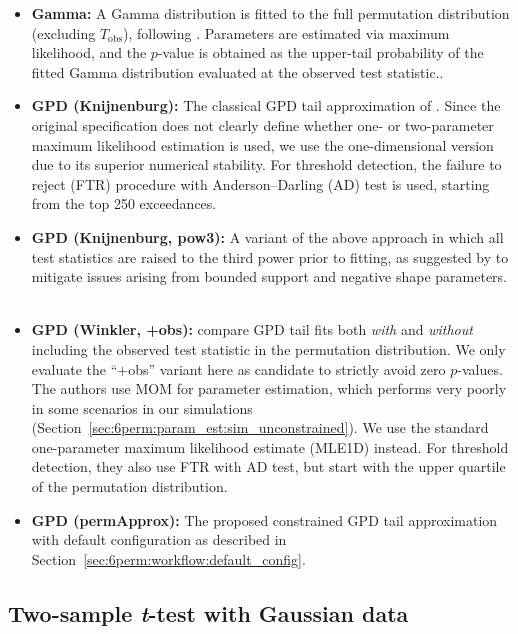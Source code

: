 \begin{itemize}
    \item \textbf{Gamma:} 
    A Gamma distribution is fitted to the full permutation distribution (excluding $T_{\mathrm{obs}}$), following \citet{winkler2016faster}. Parameters are estimated via maximum likelihood, and the $p$-value is obtained as the upper-tail probability of the fitted Gamma distribution evaluated at the observed test statistic..

    \item \textbf{GPD (Knijnenburg):} 
    The classical GPD tail approximation of \citet{knijnenburg2009fewer}. Since the original specification does not clearly define whether one- or two-parameter maximum likelihood estimation is used, we use the one-dimensional version due to its superior numerical stability. For threshold detection, the failure to reject (FTR) procedure with Anderson–Darling (AD) test is used, starting from the top 250 exceedances.
    
    \item \textbf{GPD (Knijnenburg, pow3):} 
    A variant of the above approach in which all test statistics are raised to the third power prior to fitting, as suggested by \citet{knijnenburg2009fewer} to mitigate issues arising from bounded support and negative shape parameters.\\~\\

    \item \textbf{GPD (Winkler, +obs):}
    \citet{winkler2016faster} compare GPD tail fits both \emph{with} and \emph{without} including the observed test statistic in the permutation distribution. We only evaluate the ``+obs'' variant here as candidate to strictly avoid zero $p$-values. The authors use MOM for parameter estimation, which performs very poorly in some scenarios in our simulations (Section~\ref{sec:6perm:param_est:sim_unconstrained}). We use the standard one-parameter maximum likelihood estimate (MLE1D) instead. For threshold detection, they also use FTR with AD test, but start with the upper quartile of the permutation distribution.

    \item \textbf{GPD (permApprox):} 
    The proposed constrained GPD tail approximation with default configuration as described in Section~\ref{sec:6perm:workflow:default_config}.
\end{itemize}

\subsection{Two-sample \textit{t}-test with Gaussian data}
\label{sec:6perm:sim:ttest}

